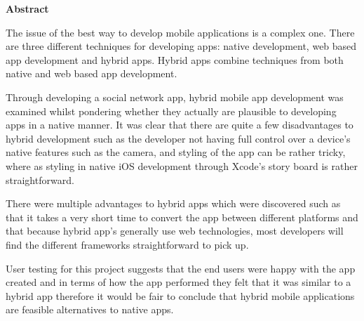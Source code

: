 \thispagestyle{empty}

\begin{center}
    {\LARGE\bf Abstract}
\end{center}

The issue of the best way to develop mobile applications is a complex one. There are three different techniques for developing apps: native development, web based app development and hybrid apps. Hybrid apps combine techniques from both native and web based app development.

Through developing a social network app, hybrid mobile app development was examined whilst pondering whether they actually are plausible to developing apps in a native manner. It was clear that there are quite a few disadvantages to hybrid development such as the developer not having full control over a device's native features such as the camera, and styling of the app can be rather tricky, where as styling in native iOS development through Xcode's story board is rather straightforward. 

There were multiple advantages to hybrid apps which were discovered such as that it takes a very short time to convert the app between different platforms and that because hybrid app's generally use web technologies, most developers will find the different frameworks straightforward to pick up. 

User testing for this project suggests that the end users were happy with the app created and in terms of how the app performed they felt that it was similar to a hybrid app therefore it would be fair to conclude that hybrid mobile applications are feasible alternatives to native apps.
